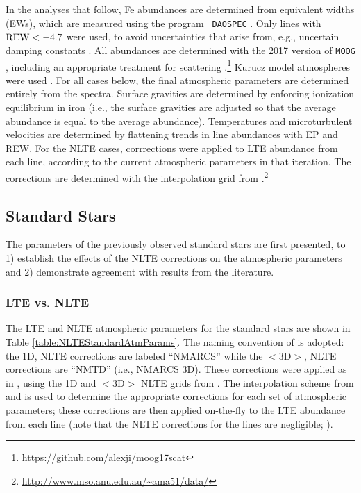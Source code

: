 \documentclass[preprint]{aastex61}
\begin{document}
In the analyses that follow, Fe abundances are determined from
equivalent widths (EWs), which are measured using the program {\tt
  DAOSPEC} \citep{DAOSPECref}.  Only lines with $\rm{REW}<-4.7$ were
used, to avoid uncertainties that arise from, e.g., uncertain damping
constants \citep{McWilliam1995}. All abundances are determined with
the 2017 version of {\tt MOOG} \citep{Sneden}, including an
appropriate treatment for scattering
\citep{Sobeck2011}.\footnote{\url{https://github.com/alexji/moog17scat}}
Kurucz model atmospheres were used \citep{KuruczModelAtmRef}.
For all cases below, the final atmospheric parameters are determined
entirely from the spectra.  Surface gravities are determined by
enforcing ionization equilibrium in iron (i.e., the surface gravities
are adjusted so that the average  abundance is equal to the
average  abundance).  Temperatures and microturbulent
velocities are determined by flattening trends in  line
abundances with EP and REW.  For the NLTE cases, corrrections were
applied to LTE abundance from each  line, according to the
current atmospheric parameters in that iteration.  The corrections are
determined with the interpolation grid from
\citet{Amarsi2016}.\footnote{\url{http://www.mso.anu.edu.au/~ama51/data/}}


\subsection{Standard Stars}\label{subsec:StandardAtmParams}
The parameters of the previously observed standard stars are first
presented, to 1) establish the effects of the NLTE corrections on the
atmospheric parameters and 2) demonstrate agreement with results from
the literature.

\subsubsection{LTE vs. NLTE}\label{subsubsec:LTEvNLTE}
The LTE and NLTE atmospheric parameters for the standard stars are
shown in Table \ref{table:NLTEStandardAtmParams}.  The naming
convention of \citet{Amarsi2016} is adopted: the 1D, NLTE corrections
are labeled ``NMARCS'' while the $<$3D$>$, NLTE corrections are
``NMTD'' (i.e., NMARCS 3D).  These corrections were applied as in
\citet{Ruchti2013}, using the 1D and $<$3D$>$ NLTE grids from
\citet{Amarsi2016}.  The interpolation scheme from \citet{Lind2012}
and \citet{Amarsi2016} is used to determine the appropriate
corrections for each set of atmospheric parameters; these corrections
are then applied on-the-fly to the LTE abundance from
each  line (note that the NLTE corrections for the
 lines are negligible; \citealt{Ruchti2013}).
\end{document}
